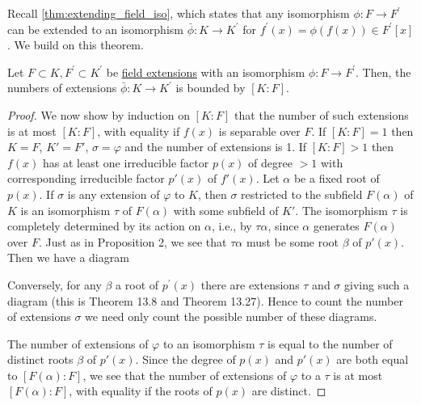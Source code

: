   Recall \ref{thm:extending_field_iso}, which states that any isomorphism $\phi: F \to F^\prime$ can be extended to an isomorphism $\bar{\phi}: K \to K^\prime$ for $f^\prime (x) = \phi(f(x)) \in F^\prime[x]$. We build on this theorem. 

  \begin{theorem}
    \label{thm:bound-on-number-of-field-isomorphism-extensions}
    Let $F \subset K, F^\prime \subset K^\prime$ be \hyperref[def:field-extension]{field extensions} with an isomorphism $\phi:F \to F^\prime$. Then, the numbers of extensions $\bar{\phi}: K \to K^\prime$ is bounded by $[K:F]$. 
  \end{theorem}
  \begin{proof}
    We now show by induction on $[K : F]$ that the number of such extensions is at most $[K : F]$, with equality if $f(x)$ is separable over $F$. If $[K : F] = 1$ then $K = F$, $K' = F'$, $\sigma = \varphi$ and the number of extensions is 1. If $[K : F] > 1$ then $f(x)$ has at least one irreducible factor $p(x)$ of degree $> 1$ with corresponding irreducible factor $p'(x)$ of $f'(x)$. Let $\alpha$ be a fixed root of $p(x)$. If $\sigma$ is any extension of $\varphi$ to $K$, then $\sigma$ restricted to the subfield $F(\alpha)$ of $K$ is an isomorphism $\tau$ of $F(\alpha)$ with some subfield of $K'$. The isomorphism $\tau$ is completely determined by its action on $\alpha$, i.e., by $\tau\alpha$, since $\alpha$ generates $F(\alpha)$ over $F$. Just as in Proposition 2, we see that $\tau\alpha$ must be some root $\beta$ of $p'(x)$. Then we have a diagram

    \begin{figure}[H]
      \centering 
    \end{figure}

    Conversely, for any $\beta$ a root of $p^\prime(x)$ there are extensions $\tau$ and $\sigma$ giving such a diagram (this is Theorem 13.8 and Theorem 13.27). Hence to count the number of extensions $\sigma$ we need only count the possible number of these diagrams.

    The number of extensions of $\varphi$ to an isomorphism $\tau$ is equal to the number of distinct roots $\beta$ of $p'(x)$. Since the degree of $p(x)$ and $p'(x)$ are both equal to $[F(\alpha) : F]$, we see that the number of extensions of $\varphi$ to a $\tau$ is at most $[F(\alpha) : F]$, with equality if the roots of $p(x)$ are distinct.


\end{proof}
